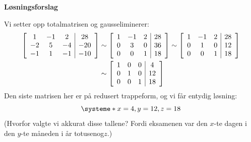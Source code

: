 \documentclass[notitlepage,a4paper,12pt,norsk]{IMFeksamen}
\newcommand{\roweq}{\sim}
\newcommand{\0}{\V{0}}
\newenvironment{amatrix}[1]{%
  \left[\begin{array}{*{#1}{c}|c}
}{%
  \end{array}\right]
}
\newcommand{\oppgslutt}{
\begin{center}
\pgfornament[width=6cm]{88}
\end{center}
}
\newenvironment{losning}{\begin{oppgave}}{\oppgslutt\end{oppgave}}
\begin{document}
\begin{center}
\textbf{\large Løsningsforslag} \\[3pt]
\end{center}
\vspace{-10pt}


\begin{losning}
Vi setter opp totalmatrisen og gausseliminerer:
\begin{align*}
\begin{amatrix}{3}
1 & -1 & 2 & 28 \\
-2 & 5 & -4 & -20 \\
-1 & 1 & -1 & -10
\end{amatrix}
&\roweq
\begin{amatrix}{3}
1 & -1 & 2 & 28 \\
0 & 3 & 0 & 36 \\
0 & 0 & 1 & 18
\end{amatrix}
\roweq
\begin{amatrix}{3}
1 & -1 & 2 & 28 \\
0 & 1 & 0 & 12 \\
0 & 0 & 1 & 18
\end{amatrix}
\\
&\roweq
\begin{amatrix}{3}
1 & 0 & 0 & 4 \\
0 & 1 & 0 & 12 \\
0 & 0 & 1 & 18
\end{amatrix}
\end{align*}
Den siste matrisen her er på redusert trappeform,
og vi får entydig løsning:
\[
\systeme*{
x = 4,
y = 12,
z = 18
}
\]
(Hvorfor valgte vi akkurat disse tallene?
Fordi eksamenen var den $x$-te dagen i den $y$-te måneden i år
totusenog$z$.)
\end{losning}
\end{document}
